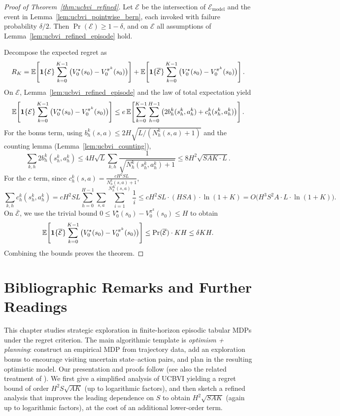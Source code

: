 \begin{proof}[Proof of Theorem~\ref{thm:ucbvi_refined}]
Let $\mathcal{E}$ be the intersection of $\mathcal{E}_{\mathrm{model}}$ and the event in
Lemma~\ref{lem:ucbvi_pointwise_bern}, each invoked with failure probability $\delta/2$.
Then $\Pr(\mathcal{E})\ge 1-\delta$, and on $\mathcal{E}$ all assumptions of
Lemma~\ref{lem:ucbvi_refined_episode} hold.

Decompose the expected regret as
\[
R_K
=
\mathbb{E}\!\left[\mathbf{1}\{\mathcal{E}\}\sum_{k=0}^{K-1}\big(V_0^\star(s_0)-V_0^{\pi^k}(s_0)\big)\right]
+
\mathbb{E}\!\left[\mathbf{1}\{\overline{\mathcal{E}}\}\sum_{k=0}^{K-1}\big(V_0^\star(s_0)-V_0^{\pi^k}(s_0)\big)\right].
\]
On $\mathcal{E}$, Lemma~\ref{lem:ucbvi_refined_episode} and the law of total expectation yield
\[
\mathbb{E}\!\left[\mathbf{1}\{\mathcal{E}\}\sum_{k=0}^{K-1}\big(V_0^\star(s_0)-V_0^{\pi^k}(s_0)\big)\right]
\le
e\,\mathbb{E}\!\left[\sum_{k=0}^{K-1}\sum_{h=0}^{H-1}\big(2b_h^k(s_h^k,a_h^k)+c_h^k(s_h^k,a_h^k)\big)\right].
\]
For the bonus term, using $b_h^k(s,a)\le 2H\sqrt{L/(N_h^k(s,a)+1)}$ and the counting lemma
(Lemma~\ref{lem:ucbvi_counting}),
\[
\sum_{k,h}2b_h^k(s_h^k,a_h^k)
\le
4H\sqrt{L}\sum_{k,h}\frac{1}{\sqrt{N_h^k(s_h^k,a_h^k)+1}}
\le
8H^2\sqrt{SAK\cdot L}.
\]
For the $c$ term, since $c_h^k(s,a)=\frac{cH^2SL}{N_h^k(s,a)+1}$,
\[
\sum_{k,h}c_h^k(s_h^k,a_h^k)
=
cH^2SL\sum_{h=0}^{H-1}\sum_{s,a}\sum_{i=1}^{N_h^K(s,a)}\frac{1}{i}
\le
cH^2SL\cdot (HSA)\cdot \ln(1+K)
=
O\!\big(H^3S^2A\cdot L\cdot \ln(1+K)\big).
\]
On $\overline{\mathcal{E}}$, we use the trivial bound $0\le V_0^\star(s_0)-V_0^{\pi^k}(s_0)\le H$ to obtain
\[
\mathbb{E}\!\left[\mathbf{1}\{\overline{\mathcal{E}}\}\sum_{k=0}^{K-1}\big(V_0^\star(s_0)-V_0^{\pi^k}(s_0)\big)\right]
\le
\Pr(\overline{\mathcal{E}})\cdot KH
\le
\delta K H.
\]
Combining the bounds proves the theorem.
\end{proof}

\section{Bibliographic Remarks and Further Readings}\label{ucbvi:bib}

This chapter studies strategic exploration in finite-horizon episodic tabular MDPs
under the regret criterion. The main algorithmic template is \emph{optimism + planning}:
construct an empirical MDP from trajectory data, add an exploration bonus to encourage
visiting uncertain state--action pairs, and plan in the resulting optimistic model.
Our presentation and proofs follow \citet{pmlr-v70-azar17a} (see also the related
treatment of \citet{DBLP:conf/nips/DannLB17}). We first give a simplified
analysis of UCBVI yielding a regret bound of order $H^2 S\sqrt{AK}$ (up to logarithmic
factors), and then sketch a refined analysis that improves the leading dependence on
$S$ to obtain $H^2\sqrt{SAK}$ (again up to logarithmic factors), at the cost of an
additional lower-order term.



